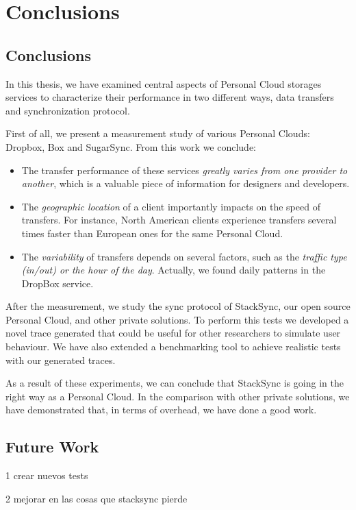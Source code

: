 \chapter{Conclusions}

\section{Conclusions}
In this thesis, we have examined central aspects of Personal Cloud storages 
services to characterize their performance in two different ways, data transfers
and synchronization protocol.

First of all, we present a measurement study of various Personal Clouds: Dropbox, Box and SugarSync.
From this work we conclude:
\begin{itemize}
	\item The transfer performance of these services 
	\textit{greatly varies from one provider to another}, which is a valuable 
	piece of information for designers and developers.
	
	\item The \textit{geographic location} of a client importantly impacts on
	the speed of transfers. For instance, North American clients experience 
	transfers several times faster than European ones for the same Personal Cloud. 
	
	\item The \textit{variability} of transfers depends on several
	factors, such as the \textit{traffic type (in/out) or the hour of the day}.
	Actually, we found daily patterns in the DropBox service.

\end{itemize}

After the measurement, we study the sync protocol of StackSync, our open source Personal Cloud,
and other private solutions. To perform this tests we developed a novel trace generated
that could be useful for other researchers to simulate user behaviour. We have also extended
a benchmarking tool to achieve realistic tests with our generated traces.

As a result of these experiments, we can conclude that StackSync is going in the right
way as a Personal Cloud. In the comparison with other private solutions, we have demonstrated that,
in terms of overhead, we have done a good work.

\section{Future Work}

1 crear nuevos tests

2 mejorar en las cosas que stacksync pierde